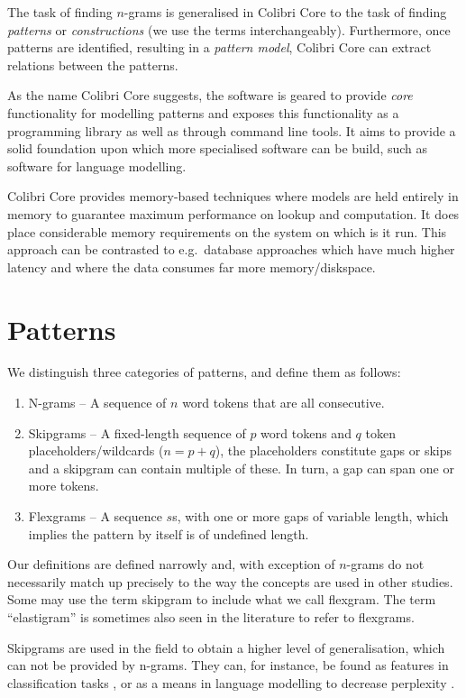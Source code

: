 \documentclass[review]{elsarticle}
\begin{document}
The task of finding $n$-grams is generalised in Colibri Core to the task of
finding \emph{patterns} or \emph{constructions} (we use the terms
interchangeably). Furthermore, once patterns are identified, resulting in a
\emph{pattern model}, Colibri Core can extract relations between the patterns.

As the name Colibri Core suggests, the software is geared to provide
\emph{core} functionality for modelling patterns and exposes this functionality
as a programming library as well as through command line tools. It aims to
provide a solid foundation upon which more specialised software can be build,
such as software for language modelling.

Colibri Core provides memory-based techniques where models are held entirely in
memory to guarantee maximum performance on lookup and computation. It does
place considerable memory requirements on the system on which is it run. This
approach can be contrasted to e.g.\ database approaches which have much higher
latency and where the data consumes far more memory/diskspace.

\section{Patterns}

We distinguish three categories of patterns, and define them as follows:

\begin{enumerate}
    \item N-grams -- A sequence of $n$ word tokens that are all consecutive.
    \item Skipgrams -- A fixed-length sequence of $p$ word tokens and $q$ token placeholders/wildcards ($n=p+q$), the placeholders constitute gaps or skips and a skipgram can contain multiple of these. In turn, a gap can span one or more tokens. 
    \item Flexgrams -- A sequence $s$s, with one or more gaps of variable length, which implies the pattern by itself is of undefined length.
\end{enumerate}

Our definitions are defined narrowly and, with exception of $n$-grams do not
necessarily match up precisely to the way the concepts are used in other studies. Some
may use the term skipgram to include what we call flexgram.  The term
``elastigram'' is sometimes also seen in the literature to refer to flexgrams. 

Skipgrams are used in the field to obtain a higher level of generalisation, which
can not be provided by n-grams. They can, for instance, be found as features in
classification tasks \citep{DHONDT}, or as a means in language modelling to
decrease perplexity \citep{Guthrie06}.
\end{document}
